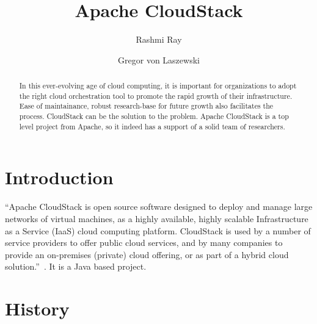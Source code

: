 
\title{Apache CloudStack}


\author{Rashmi Ray}

\author{Gregor von Laszewski}


\renewcommand{\shortauthors}{G. v. Laszewski}


\begin{abstract}

  In this ever-evolving age of cloud computing, it is important for
  organizations to adopt the right cloud orchestration tool to promote
  the rapid growth of their infrastructure. Ease of maintainance, 
  robust research-base for future growth
  also facilitates the process. CloudStack can be the solution to 
  the problem. Apache CloudStack is a top level project from Apache, so it
  indeed has a support of a solid team of researchers.

\end{abstract}


\maketitle

\section{Introduction}

``Apache CloudStack is open source software designed to deploy and
manage large networks of virtual machines, as a highly available,
highly scalable Infrastructure as a Service (IaaS) cloud computing
platform. CloudStack is used by a number of service providers to offer
public cloud services, and by many companies to provide an on-premises
(private) cloud offering, or as part of a hybrid cloud
solution.''~\cite{hid-sp18-417-www-cloudstack-intro}. It is a Java based project.


\section{History}

